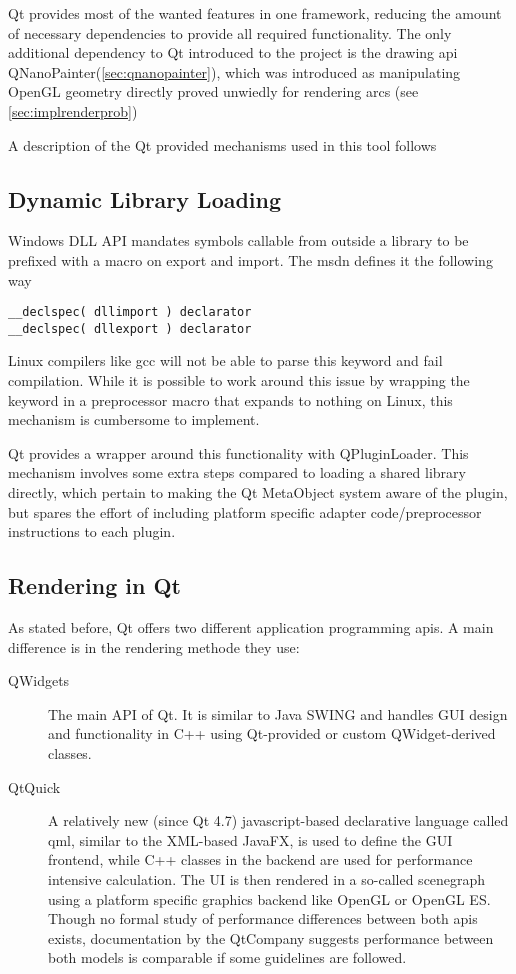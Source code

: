 Qt provides most of the wanted features in one framework, reducing the amount of necessary dependencies to provide all required functionality. The only additional dependency to Qt introduced to the project is the drawing \gls{api} QNanoPainter(\ref{sec:qnanopainter}), which was introduced as manipulating OpenGL geometry directly proved unwiedly for rendering arcs (see \ref{sec:implrenderprob})

A description of the Qt provided mechanisms used in this tool follows

\subsection{Dynamic Library Loading}
Windows DLL API mandates symbols callable from outside a library to be prefixed with a macro on export and import. The \gls{msdn} defines it the following way
\begin{lstlisting}
__declspec( dllimport ) declarator  
__declspec( dllexport ) declarator  
\end{lstlisting}

Linux compilers like gcc will not be able to parse this keyword and fail compilation. While it is possible to work around this issue by wrapping the keyword in a preprocessor macro that expands to nothing on Linux, this mechanism is cumbersome to implement.

Qt provides a wrapper around this functionality with QPluginLoader. This mechanism involves some extra steps compared to loading a shared library directly, which pertain to making the Qt MetaObject system aware of the plugin, but spares the effort of including platform specific adapter code/preprocessor instructions to each plugin.

\subsection{Rendering in Qt}
\label{sec:qtrender}
As stated before, Qt offers two different application programming \gls{api}s. A main difference is in the rendering methode they use:
\begin{description}
	\item [QWidgets] The main API of Qt. It is similar to Java SWING and handles GUI design and functionality in C++ using Qt-provided or custom QWidget-derived classes.
	\item [QtQuick] A relatively new (since Qt 4.7) javascript-based declarative language called \gls{qml}, similar to the XML-based JavaFX, is used to define the GUI frontend, while C++ classes in the backend are used for performance intensive calculation. The UI is then rendered in a so-called scenegraph using a platform specific graphics backend like OpenGL or OpenGL ES. Though no formal study of performance differences between both \gls{api}s exists, documentation by the QtCompany suggests performance between both models is comparable if some guidelines are followed.
\end{description}

